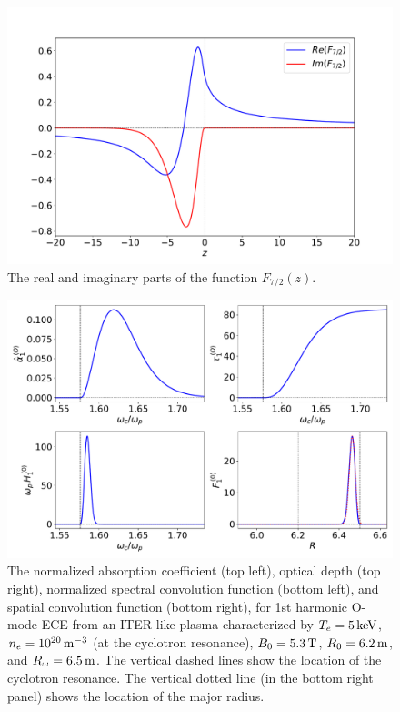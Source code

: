 \documentclass[12pt,prb,aps]{revtex4-1}
\begin{document}
\begin{figure}
\centerline{\includegraphics[width=\textwidth]{F72.pdf}}
\caption{The real and imaginary parts of the function $F_{7/2}(z)$.\label{f72}}
\end{figure}

\begin{figure}
\centerline{\includegraphics[width=\textwidth]{O.pdf}}
\caption{The normalized  absorption coefficient (top left), optical depth (top right), normalized
spectral convolution function (bottom left), and spatial convolution function (bottom right), for 1st harmonic O-mode ECE from an
ITER-like plasma characterized by  $T_e=5\,{\rm keV}$, $n_e=10^{20}\,{\rm m}^{-3}$ (at the cyclotron resonance), $B_0=5.3\,{\rm T}$, $R_0=6.2\,{\rm m}$, and $R_\omega= 6.5\,{\rm m}$.
The vertical dashed lines show the location of the cyclotron resonance.  The vertical dotted line (in the bottom right panel) shows the location of the major radius. \label{Omode}}
\end{figure}
\end{document}
